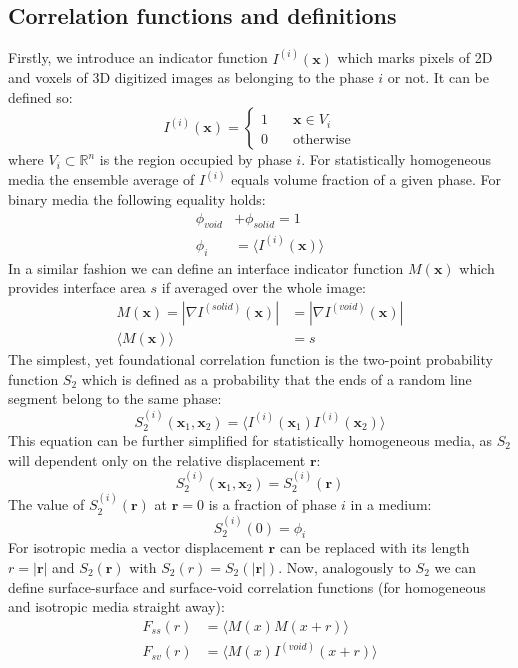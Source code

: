 \documentclass[reprint,amsmath,amssymb,aps,pre,showkeys,showpacs]{revtex4-1}
\begin{document}
\subsection{Correlation functions and definitions}
\label{sec:definitions}
Firstly, we introduce an indicator function $I^{(i)}(\mathbf{x})$ which marks
pixels of 2D and voxels of 3D digitized images as belonging to the phase $i$ or
not. It can be defined so:
\begin{equation*}
  I^{(i)}(\mathbf{x}) = \left\{
  \begin{array}{ll}
    1 & \quad \mathbf{x} \in V_i \\
    0 & \quad \text{otherwise}
  \end{array}
  \right.
\end{equation*}
where $V_i \subset \mathbb{R}^n$ is the region occupied by phase $i$. For
statistically homogeneous media the ensemble average of $I^{(i)}$ equals volume
fraction of a given phase. For binary media the following equality holds:
\begin{align*}
  \phi_{void} &+ \phi_{solid} = 1 \\
  \phi_i &= \langle I^{(i)}(\mathbf{x}) \rangle
\end{align*}
In a similar fashion we can define an interface indicator function
$M(\mathbf{x})$ which provides interface area $s$ if averaged over the whole
image:
\begin{align}
  M(\mathbf{x}) = |\nabla I^{(solid)}(\mathbf{x})| &= |\nabla I^{(void)}(\mathbf{x})|
  \label{eq:interface} \\
  \langle M(\mathbf{x}) \rangle &= s
  \label{eq:surface}
\end{align}
The simplest, yet foundational correlation function is the two-point probability
function $S_2$ which is defined as a probability that the ends of a random line
segment belong to the same phase:
\begin{equation}
  S_2^{(i)}(\mathbf{x}_1, \mathbf{x}_2) = \langle I^{(i)}(\mathbf{x}_1)
  I^{(i)}(\mathbf{x}_2) \rangle \label{eq:twopoint}
\end{equation}
This equation can be further simplified for statistically homogeneous media, as
$S_2$ will dependent only on the relative displacement $\mathbf{r}$:
\begin{equation*}
  S_2^{(i)}(\mathbf{x}_1, \mathbf{x}_2) = S_2^{(i)}(\mathbf{r})
\end{equation*}
The value of $S^{(i)}_2(\mathbf{r})$ at $\mathbf{r} = 0$ is a fraction of phase
$i$ in a medium:
\begin{equation*}
  S_2^{(i)}(0) = \phi_i
\end{equation*}
For isotropic media a vector displacement $\mathbf{r}$ can be replaced with its
length $r = |\mathbf{r}|$ and $S_2(\mathbf{r})$ with $S_2(r) = S_2(|\mathbf{r}|)$.
Now, analogously to $S_2$ we can define surface-surface and surface-void
correlation functions (for homogeneous and isotropic media straight away):
\begin{align}
  F_{ss}(r) &= \langle M(x)M(x+r) \rangle \label{eq:fss} \\
  F_{sv}(r) &= \langle M(x)I^{(void)}(x+r) \label{eq:fsv} \rangle
\end{align}
\end{document}

